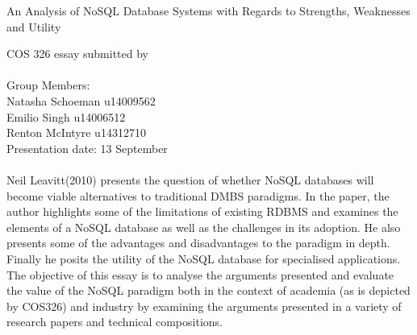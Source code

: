 \documentclass[12pt]{article}
\begin{document}
\begin{titlepage}

\begin{center}
\begin{Huge}
An Analysis of NoSQL Database Systems with Regards to Strengths, Weaknesses and Utility
\begin{large}
\begin{center}
COS 326 essay submitted by
\\
\\
Group Members:\\
Natasha Schoeman u14009562
\\
Emilio Singh u14006512
\\
Renton McIntyre u14312710
\\
Presentation date: 13 September

\end{center}
\end{large}
\end{Huge}

\end{center}
\end{titlepage}
\pagebreak

\paragraph{}
Neil Leavitt(2010) presents the question of whether NoSQL databases will become viable alternatives to traditional DMBS paradigms. In the paper, the author highlights some of the limitations of existing RDBMS and examines the elements of a NoSQL database as well as the challenges in its adoption. He also presents some of the advantages and disadvantages to the paradigm in depth. Finally he posits the utility of the NoSQL database for specialised applications. The objective of this essay is to analyse the arguments presented and evaluate the value of the NoSQL paradigm both in the context of academia (as is depicted by COS326) and industry by examining the arguments presented in a variety of research papers and technical compositions.
\end{document}
